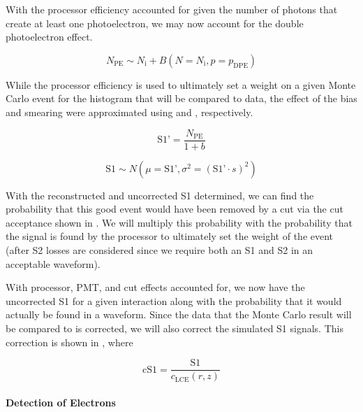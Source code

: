With the processor efficiency accounted for given the number of photons that create at least one photoelectron, we may now account for the double photoelectron effect.  

\begin{equation}
        N_{\textrm{PE}} \sim N_{\textrm{i}} + B(N=N_{\textrm{i}}, p=p_{\textrm{DPE}})
\end{equation}


While the processor efficiency is used to ultimately set a weight on a given Monte Carlo event for the histogram that will be compared to data, the effect of the bias and smearing were approximated using  and , respectively.  

\begin{equation}
        \label{eqn:xe1t_s1_bias}
        \textrm{S1'} = \frac{N_{\textrm{PE}}}{1 + b}
\end{equation}


\begin{equation}
        \label{eqn:xe1t_s1_smearing}
        \textrm{S1} \sim N(\mu = \textrm{S1'}, \sigma^2 = (\textrm{S1'} \cdot s)^2)
\end{equation}


With the reconstructed and uncorrected S1 determined, we can find the probability that this good event would have been removed by a cut via the cut acceptance shown in .  We will multiply this probability with the probability that the signal is found by the processor to ultimately set the weight of the event (after S2 losses are considered since we require both an S1 and S2 in an acceptable waveform).


With processor, PMT, and cut effects accounted for, we now have the uncorrected S1 for a given interaction along with the probability that it would actually be found in a waveform.  Since the data that the Monte Carlo result will be compared to is corrected, we will also correct the simulated S1 signals.  This correction is shown in , where 

\begin{equation}
        \label{eqn:xe1t_s1_recorrect}
        \textrm{cS1} = \frac{\textrm{S1}}{c_{\textrm{LCE}}(r, z)}
\end{equation}




\paragraph{Detection of Electrons}
\label{sec:xe1t_mc_electrons}


